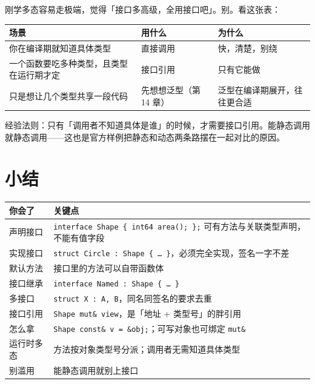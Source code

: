 刚学多态容易走极端，觉得「接口多高级，全用接口吧」。别。看这张表：

{\small\setlength{\tabcolsep}{4pt}
\begin{longtable}{>{\raggedright\arraybackslash}p{}>{\raggedright\arraybackslash}p{}>{\raggedright\arraybackslash}p{}}
\toprule
场景 & 用什么 & 为什么 \\
\midrule
\endhead
你在编译期就知道具体类型 & 直接调用 & 快，清楚，别绕 \\
一个函数要吃多种类型，且类型在运行期才定 & 接口引用 & 只有它能做 \\
只是想让几个类型共享一段代码 & 先想想泛型（第 14 章） & 泛型在编译期展开，往往更合适 \\
\bottomrule
\end{longtable}
}

经验法则：只有「调用者不知道具体是谁」的时候，才需要接口引用。能静态调用就静态调用——这也是官方样例把静态和动态两条路摆在一起对比的原因。

\section{小结}

\begin{center}
\begin{tabular}{ll}
\toprule
你会了 & 关键点 \\
\midrule
声明接口 & \texttt{interface Shape \{ int64 area(\allowbreak{})\allowbreak{}; \};} 可有方法与关联类型声明，不能有值字段 \\
实现接口 & \texttt{struct Circle :\allowbreak{} Shape \{ … \}}，必须完全实现，签名一字不差 \\
默认方法 & 接口里的方法可以自带函数体 \\
接口继承 & \texttt{interface Named :\allowbreak{} Shape \{ … \}} \\
多接口 & \texttt{struct X :\allowbreak{} A,\allowbreak{} B}，同名同签名的要求去重 \\
接口引用 & \texttt{Shape mut\& view}，是「地址 + 类型号」的胖引用 \\
怎么拿 & \texttt{Shape const\& v =\allowbreak{} \&obj;}；可写对象也可绑定 \texttt{mut\&} \\
运行时多态 & 方法按对象类型号分派；调用者无需知道具体类型 \\
别滥用 & 能静态调用就别上接口 \\
\bottomrule
\end{tabular}
\end{center}

